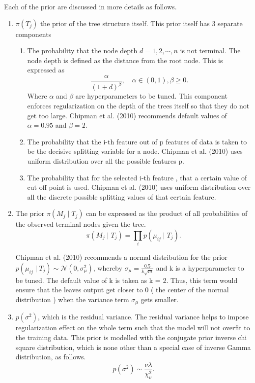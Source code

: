 \documentclass{usiinftr}
\begin{document}
Each of the prior are discussed in more details as follows.
\begin{enumerate}
\item $\pi(T_j)$ the prior of the tree structure itself. This prior itself has 3 separate components
			\begin{enumerate}
				\item The probability that the node depth $d = 1,2,\cdots,n$ is not terminal. The node depth is defined as the distance from the root node. This is expressed as 
			\begin{equation}\frac{\alpha}{(1+d)^{\beta}}, \quad \alpha \in (0,1), \beta \geq 0 . \end{equation}
			Where $\alpha$ and $\beta$ are hyperparameters to be tuned. This component enforces regularization on the depth of the trees itself so that they do not get too large. Chipman et al. (2010) recommends default values of $\alpha = 0.95$ and $\beta =2$.
				\item The probability that the i-th feature out of p features of data is taken to be the decisive splitting variable for a node. Chipman et al. (2010) uses uniform distribution over all the possible features p.
				\item The probability that for the selected i-th feature , that a certain value of cut off point is used. Chipman et al. (2010) uses uniform distribution over all the discrete possible splitting values of that certain feature.
			\end{enumerate} 
\item The prior $\pi(M_j \mid T_j)$ can be expressed as the product of all probabilities of the observed terminal nodes given the tree.
\begin{equation}\pi(M_j \mid T_j) = \prod_i p(\mu_{ij} \mid T_j). \end{equation}

Chipman et al. (2010) recommends a normal distribution for the prior $p( \mu_{ij} \mid T_j) \sim \mathcal{N}(0, \sigma^2_{ \mu })$, whereby $ \sigma_{ \mu } = \frac{0.5}{k \sqrt{m}}$  and k is a hyperparameter to be tuned. The default value of k is taken as k = 2. Thus, this term would ensure that the leaves output get closer to 0 ( the center of the normal distribution ) when the variance term $\sigma_{ \mu}$ gets smaller.
\item $p(\sigma^2)$, which is the residual variance. The residual variance helps to impose regularization effect on the whole term such that the model will not overfit to the training data. This prior is modelled with the conjugate prior inverse chi square distribution, which is none other than a special case of inverse Gamma distribution, as follows.
\begin{equation}p(\sigma^2) \sim \frac{\nu \lambda}{\chi_{\nu}^2}. \end{equation}


\end{enumerate}
\end{document}
